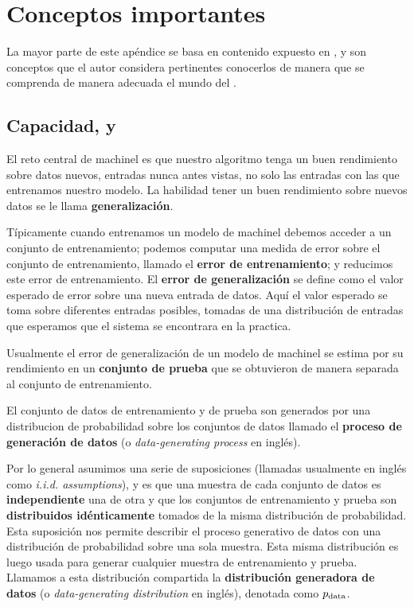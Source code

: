 \chapter{Conceptos importantes} %
\label{appendix:keyconcepts} %

La mayor parte de este apéndice se basa en contenido expuesto en \cite{deeplearning}, y son conceptos que el autor considera pertinentes conocerlos de manera que se comprenda de manera adecuada el mundo del .

\section{Capacidad,  y }
El reto central de \gls{machinel} es que nuestro algoritmo tenga un buen rendimiento sobre datos nuevos, entradas nunca antes vistas, no solo las entradas con las que entrenamos nuestro modelo. La habilidad tener un buen rendimiento sobre nuevos datos se le llama \textbf{generalización}.

Típicamente cuando entrenamos un modelo de \gls{machinel} debemos acceder a un conjunto de entrenamiento; podemos computar una medida de error sobre el conjunto de entrenamiento, llamado el \textbf{error de entrenamiento}; y reducimos este error de entrenamiento. El \textbf{error de generalización} se define como el valor esperado de error sobre una nueva entrada de datos. Aquí el valor esperado se toma sobre diferentes entradas posibles, tomadas de una distribución de entradas que esperamos que el sistema se encontrara en la practica.

Usualmente el error de generalización de un modelo de \gls{machinel} se estima por su rendimiento en un \textbf{conjunto de prueba} que se obtuvieron de manera separada al conjunto de entrenamiento.

El conjunto de datos de entrenamiento y de prueba son generados por una distribucion de probabilidad sobre los conjuntos de datos llamado el \textbf{proceso de generación de datos} (o \textsl{data-generating process} en inglés).

Por lo general asumimos una serie de suposiciones (llamadas usualmente en inglés como \textsl{i.i.d. assumptions}), y es que una muestra de cada conjunto de datos es \textbf{independiente} una de otra y que los conjuntos de entrenamiento y prueba son \textbf{distribuidos idénticamente} tomados de la misma distribución de probabilidad. Esta suposición nos permite describir el proceso generativo de datos con una distribución de probabilidad sobre una sola muestra. Esta misma distribución es luego usada para generar cualquier muestra de entrenamiento y prueba. Llamamos a esta distribución compartida la \textbf{distribución generadora de datos} (o \textsl{data-generating distribution} en inglés), denotada como $p_{\rm{data}}$.


